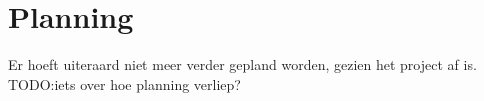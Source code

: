 \documentclass[11pt, a4paper]{article}
\begin{document}
\section{Planning}
Er hoeft uiteraard niet meer verder gepland worden, gezien het project af is.
TODO:iets over hoe planning verliep?

\end{document}
